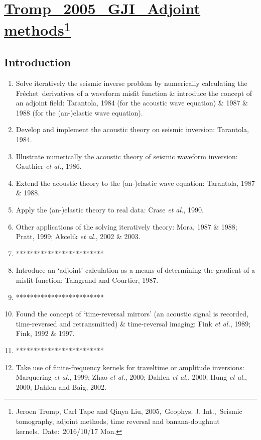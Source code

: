 \documentclass{article}
\newcommand{\Ppath}{/home/tche/Learning/Learning/Paper/}
\newcommand{\prf}{This is relative path from \Papth to the paper file}
\newcommand{\pmk}{This is the brief info.}
\newcommand{\pti}{This is the paper tile}
\newcommand{\pay}{These are authors and year}
\newcommand{\pjo}{This is the journal}
\newcommand{\pda}{This is the date}
\newcommand{\refp}[1]{\href{run:\Ppath\prf}{#1}}
\newcommand{\pinfo}{\refp{\pmk}\footnote{\pay,~\pjo,~\pti.~Date:~\pda}}
\newcommand{\sline}{*************************}
\newcommand{\Frechet}{Fr\'{e}chet~}
\newcommand{\etal}{\textit{et al.}}
\begin{document}
\renewcommand{\pmk}{Tromp\_2005\_GJI\_Adjoint methods}
\renewcommand{\prf}{FWI/\pmk.pdf}
\renewcommand{\pti}{Seismic tomography, adjoint methods, time reversal and banana-doughnut kernels}
\renewcommand{\pay}{Jeroen Tromp, Carl Tape and Qinya Liu, 2005}
\renewcommand{\pjo}{Geophys. J. Int.}
\renewcommand{\pda}{2016/10/17 Mon.}
\section{\pinfo}
\subsection{Introduction}
\begin{enumerate}[\hspace{10mm}*]
  \item Solve iteratively the seismic inverse problem by numerically calculating the \Frechet derivatives of a waveform misfit function \& introduce the concept of an adjoint field: Tarantola, 1984 (for the acoustic wave equation) \& 1987 \& 1988 (for the (an-)elastic wave equation).
  \item Develop and implement the acoustic theory on seismic inversion: Tarantola, 1984.
  \item Illustrate numerically the acoustic theory of seismic waveform inversion: Gauthier \etal, 1986.
  \item Extend the acoustic theory to the (an-)elastic wave equation: Tarantola, 1987 \& 1988.
  \item Apply the (an-)elastic theory to real data: Crase \etal, 1990.
  \item Other applications of the solving iteratively theory: Mora, 1987 \& 1988; Pratt, 1999; Akcelik \etal, 2002 \& 2003.
  \item \sline
  \item Introduce an `adjoint' calculation as a means of determining the gradient of a misfit function: Talagrand and Courtier, 1987.
  \item \sline
  \item Found the concept of `time-reversal mirrors' (an acoustic signal is recorded, time-reversed and retransmitted) \& time-reversal imaging: Fink \etal, 1989; Fink, 1992 \& 1997.
  \item \sline
  \item Take use of finite-frequency kernels for traveltime or amplitude inversions: Marquering \etal, 1999; Zhao \etal, 2000; Dahlen \etal, 2000; Hung \etal, 2000; Dahlen and Baig, 2002.

\end{enumerate}
\end{document}
